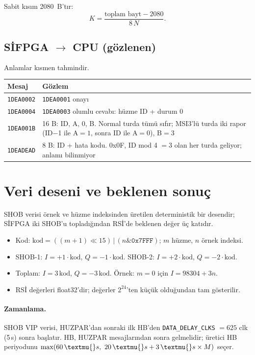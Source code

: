 \documentclass[11pt,a4paper]{article}
\newcommand{\us}{\,\textmu{}s}
\newcommand{\kod}[1]{\texttt{#1}}
\begin{document}
Sabit kısım 2080~B'tır:
\[
  K = \frac{\text{toplam bayt} - 2080}{8\,N}.
\]

\subsection{SİFPGA $\to$ CPU (gözlenen)}

Anlamlar kısmen tahmindir.

\begin{longtable}{@{}p{2.6cm}p{12.3cm}@{}}
\toprule
Mesaj & Gözlem \\
\midrule
\endhead
\kod{1DEA0002} & \kod{1DEA0001} onayı \\
\kod{1DEA0004} & \kod{1DEA0003} olumlu cevabı: hüzme ID + durum 0 \\
\kod{1DEA001B} & 16 B: ID, A, 0, B. Normal turda tümü sıfır; MSI3'lü turda iki rapor
(ID$-$1 ile A$=1$, sonra ID ile A$=0$), B$=3$ \\
\kod{1DEADEAD} & 8 B: ID + hata kodu. 0x0F, ID mod 4 $=3$ olan her turda geliyor;
anlamı bilinmiyor \\
\bottomrule
\end{longtable}

\section{Veri deseni ve beklenen sonuç}

SHOB verisi örnek ve hüzme indeksinden üretilen deterministik bir desendir;
SİFPGA iki SHOB'u topladığından RSİ'de beklenen değer üç katıdır.

\begin{itemize}[nosep]
  \item Kod: $\mathrm{kod} = ((m+1) \ll 15)\,|\,(n \mathbin{\&} \mathtt{0x7FFF})$;
        $m$ hüzme, $n$ örnek indeksi.
  \item SHOB-1: $I = +1\cdot\mathrm{kod}$, $Q = -1\cdot\mathrm{kod}$.
        SHOB-2: $I = +2\cdot\mathrm{kod}$, $Q = -2\cdot\mathrm{kod}$.
  \item Toplam: $I = 3\,\mathrm{kod}$, $Q = -3\,\mathrm{kod}$.
        Örnek: $m=0$ için $I = 98304 + 3n$.
  \item RSİ değerleri float32'dir; değerler $2^{24}$'ten küçük olduğundan
        tam gösterilir.
\end{itemize}

\paragraph{Zamanlama.}
SHOB VIP verisi, HUZPAR'dan sonraki ilk HB'den \kod{DATA\_DELAY\_CLKS} $=625$ clk
(5\us) sonra başlatır. HB, HUZPAR mesajlarından sonra gelmelidir; üretici HB
periyodunu $\max(60\us,\ 20\us + 3\us\times M)$ seçer.
\end{document}
